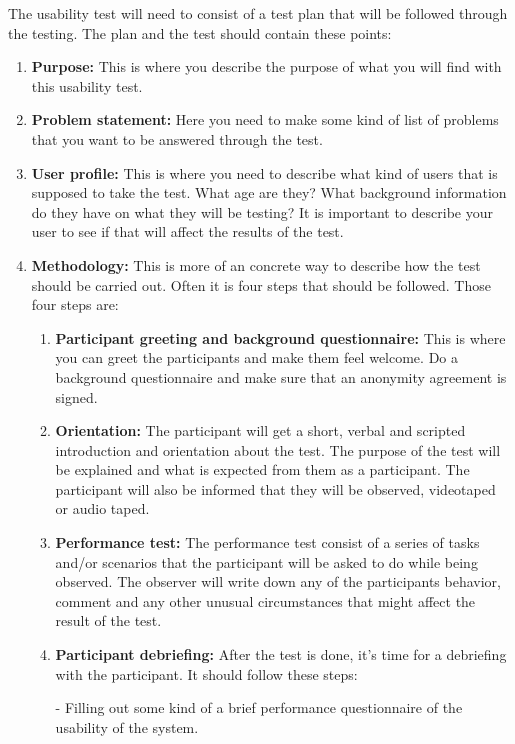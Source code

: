 The usability test will need to consist of a test plan that will be followed through the testing. The plan and the test should contain these points:\cite{usability-testing}%
\begin{enumerate}
  \item \textbf{Purpose:} This is where you describe the purpose of what you will find with this usability test.
  \item \textbf{Problem statement:} Here you need to make some kind of list of problems that you want to be answered through the test.
  \item \textbf{User profile:} This is where you need to describe what kind of users that is supposed to take the test. What age are they? What background information do they have on what they will be testing? It is important to describe your user to see if that will affect the results of the test.
  \item \textbf{Methodology:} This is more of an concrete way to describe how the test should be carried out. Often it is four steps that should be followed. Those four steps are: 
  \begin{enumerate}
  \item \textbf{Participant greeting and background questionnaire:} This is where you can greet the participants and make them feel welcome. Do a background questionnaire and make sure that an anonymity agreement is signed.
  
  \item \textbf{Orientation:} The participant will get a short, verbal and scripted introduction and orientation about the test.
  The purpose of the test will be explained and what is expected from them as a participant. The participant will also be informed that they will be observed, videotaped or audio taped.
  
  \item \textbf{Performance test:} The performance test consist of a series of tasks and/or scenarios that the participant will be asked to do while being observed. The observer will write down any of the participants behavior, comment and any other unusual circumstances that might affect the result of the test.       
  
  \item \textbf{Participant debriefing:} After the test is done, it's time for a debriefing with the participant. It should follow these steps:
  
  - Filling out some kind of a brief performance questionnaire of the usability of the system. 
  

\end{enumerate}
\end{enumerate}
